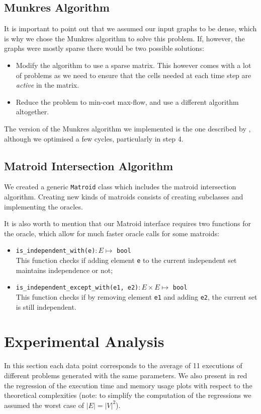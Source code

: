 \documentclass[a4,11pt]{article}
\begin{document}
\subsection{Munkres Algorithm}
It is important to point out that we assumed our input graphs to be dense, which is why we chose the Munkres algorithm to solve this problem. If, however, the graphs were mostly sparse there would be two possible solutions:
\begin{itemize}
    \setlength\itemsep{-.1em}
    \item Modify the algorithm to use a sparse matrix. This however comes with a lot of problems as we need to ensure that the cells needed at each time step are \textit{active} in the matrix.
    \item Reduce the problem to min-cost max-flow, and use a different algorithm altogether.
\end{itemize}

The version of the Munkres algorithm we implemented is the one described by \textcite{r._a._pilgrim_munkres_nodate}, although we optimised a few cycles, particularly in step 4.

\subsection{Matroid Intersection Algorithm}
We created a generic \texttt{Matroid} class which includes the matroid intersection algorithm. Creating new kinds of matroids consists of creating subclasses and implementing the oracles.

It is also worth to mention that our Matroid interface requires two functions for the oracle, which allow for much faster oracle calls for some matroids:
\begin{itemize}
    \setlength\itemsep{-.1em}
    \item \texttt{is\_independent\_with(e)}$: E \mapsto $ \texttt{bool}\\
          This function checks if adding element \texttt{e} to the current independent set maintains independence or not;
    \item \texttt{is\_independent\_except\_with(e1, e2)}$: E \times E \mapsto $ \texttt{bool}\\
          This function checks if by removing element \texttt{e1} and adding \texttt{e2}, the current set is still independent.
\end{itemize}

\section{Experimental Analysis}
In this section each data point corresponds to the average of 11 executions of different problems generated with the same parameters. We also present in red the regression of the execution time and memory usage plots with respect to the theoretical complexities (note: to simplify the computation of the regressions we assumed the worst case of $\left|E\right| = \left|V\right|^2$).
\end{document}

